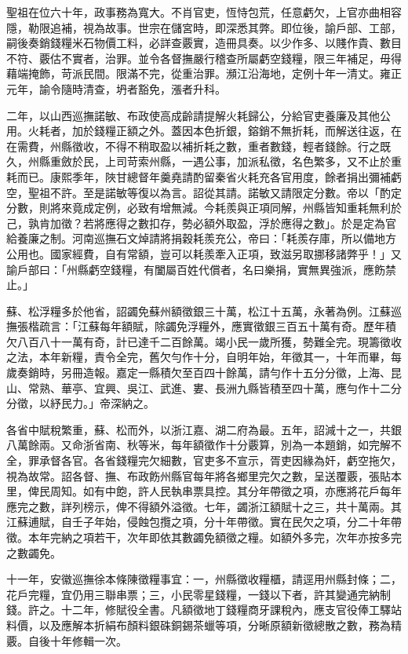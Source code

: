 \begin{pinyinscope}
聖祖在位六十年，政事務為寬大。不肖官吏，恆恃包荒，任意虧欠，上官亦曲相容隱，勒限追補，視為故事。世宗在儲宮時，即深悉其弊。即位後，諭戶部、工部，嗣後奏銷錢糧米石物價工料，必詳查覈實，造冊具奏。以少作多、以賤作貴、數目不符、覈估不實者，治罪。並令各督撫嚴行稽查所屬虧空錢糧，限三年補足，毋得藉端掩飾，苛派民間。限滿不完，從重治罪。瀕江沿海地，定例十年一清丈。雍正元年，諭令隨時清查，坍者豁免，漲者升科。

二年，以山西巡撫諾敏、布政使高成齡請提解火耗歸公，分給官吏養廉及其他公用。火耗者，加於錢糧正額之外。蓋因本色折銀，鎔銷不無折耗，而解送往返，在在需費，州縣徵收，不得不稍取盈以補折耗之數，重者數錢，輕者錢餘。行之既久，州縣重斂於民，上司苛索州縣，一遇公事，加派私徵，名色繁多，又不止於重耗而已。康熙季年，陜甘總督年羹堯請酌留秦省火耗充各官用度，餘者捐出彌補虧空，聖祖不許。至是諾敏等復以為言。詔從其請。諾敏又請限定分數。帝以「酌定分數，則將來竟成定例，必致有增無減。今耗羨與正項同解，州縣皆知重耗無利於己，孰肯加徵？若將應得之數扣存，勢必額外取盈，浮於應得之數」。於是定為官給養廉之制。河南巡撫石文焯請將捐穀耗羨充公，帝曰：「耗羨存庫，所以備地方公用也。國家經費，自有常額，豈可以耗羨牽入正項，致滋另取挪移諸弊乎！」又諭戶部曰：「州縣虧空錢糧，有闔屬百姓代償者，名曰樂捐，實無異強派，應飭禁止。」

蘇、松浮糧多於他省，詔蠲免蘇州額徵銀三十萬，松江十五萬，永著為例。江蘇巡撫張楷疏言：「江蘇每年額賦，除蠲免浮糧外，應實徵銀三百五十萬有奇。歷年積欠八百八十一萬有奇，計已達千二百餘萬。竭小民一歲所獲，勢難全完。現籌徵收之法，本年新糧，責令全完，舊欠勻作十分，自明年始，年徵其一，十年而畢，每歲奏銷時，另冊造報。嘉定一縣積欠至百四十餘萬，請勻作十五分分徵，上海、昆山、常熟、華亭、宜興、吳江、武進、婁、長洲九縣皆積至四十萬，應勻作十二分分徵，以紓民力。」帝深納之。

各省中賦稅繁重，蘇、松而外，以浙江嘉、湖二府為最。五年，詔減十之一，共銀八萬餘兩。又命浙省南、秋等米，每年額徵作十分覈算，別為一本題銷，如完解不全，罪承督各官。各省錢糧完欠細數，官吏多不宣示，胥吏因緣為奸，虧空拖欠，視為故常。詔各督、撫、布政飭州縣官每年將各鄉里完欠之數，呈送覆覈，張貼本里，俾民周知。如有中飽，許人民執串票具控。其分年帶徵之項，亦應將花戶每年應完之數，詳列榜示，俾不得額外溢徵。七年，蠲浙江額賦十之三，共十萬兩。其江蘇逋賦，自壬子年始，侵蝕包攬之項，分十年帶徵。實在民欠之項，分二十年帶徵。本年完納之項若干，次年即依其數蠲免額徵之糧。如額外多完，次年亦按多完之數蠲免。

十一年，安徽巡撫徐本條陳徵糧事宜：一，州縣徵收糧櫃，請逕用州縣封條；二，花戶完糧，宜仍用三聯串票；三，小民零星錢糧，一錢以下者，許其變通完納制錢。許之。十二年，修賦役全書。凡額徵地丁錢糧商牙課稅內，應支官役俸工驛站料價，以及應解本折絹布顏料銀硃銅錫茶蠟等項，分晰原額新徵總散之數，務為精覈。自後十年修輯一次。


\end{pinyinscope}
